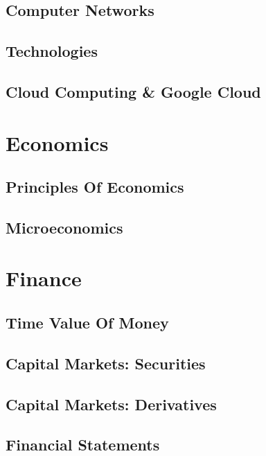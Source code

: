 \documentclass[a4paper, notitlepage]{report}
\begin{document}
\chapter{Computer Networks}


\chapter{Technologies}


\chapter{Cloud Computing \& Google Cloud}


\part{Economics}

\chapter{Principles Of Economics}


\chapter{Microeconomics}


\part{Finance}

\chapter{Time Value Of Money}


\chapter{Capital Markets: Securities}


\chapter{Capital Markets: Derivatives}


\chapter{Financial Statements}


\begin{appendices}

\end{appendices}
\end{document}
